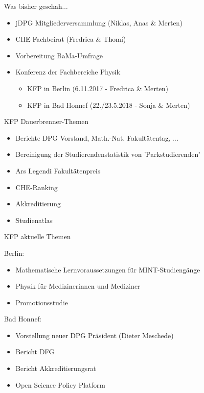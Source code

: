 \documentclass[compress, aspectratio=169]{beamer}
\begin{document}
 \begin{frame}{Was bisher geschah...}
  \begin{itemize}
   \item jDPG Mitgliederversammlung (Niklas, Anas \& Merten)
   \item CHE Fachbeirat (Fredrica \& Thomi)
   \item Vorbereitung BaMa-Umfrage
   \item Konferenz der Fachbereiche Physik
   \begin{itemize}
    \item KFP in Berlin (6.11.2017 - Fredrica \& Merten)
    \item KFP in Bad Honnef (22./23.5.2018 - Sonja \& Merten)
   \end{itemize}
  \end{itemize}
 \end{frame}
 
 
 \begin{frame}{KFP Dauerbrenner-Themen}
  \begin{itemize}
   \item Berichte DPG Vorstand, Math.-Nat. Fakultätentag, ... 
   \item Bereinigung der Studierendenstatistik von 'Parkstudierenden'
   \item Ars Legendi Fakultätenpreis
   \item CHE-Ranking
   \item Akkreditierung
   \item Studienatlas
  \end{itemize}
 \end{frame}
 
 
 \begin{frame}{KFP aktuelle Themen}
 
  Berlin:
  \begin{itemize}
   \item Mathematische Lernvoraussetzungen für MINT-Studiengänge
   \item Physik für Medizinerinnen und Mediziner
   \item Promotionsstudie
  \end{itemize}
  
  \bigskip
  
  Bad Honnef:
  \begin{itemize}
   \item Vorstellung neuer DPG Präsident (Dieter Meschede)
   \item Bericht DFG 
   \item Bericht Akkreditierungsrat 
   \item Open Science Policy Platform 
  \end{itemize}
 \end{frame}
\end{document}
